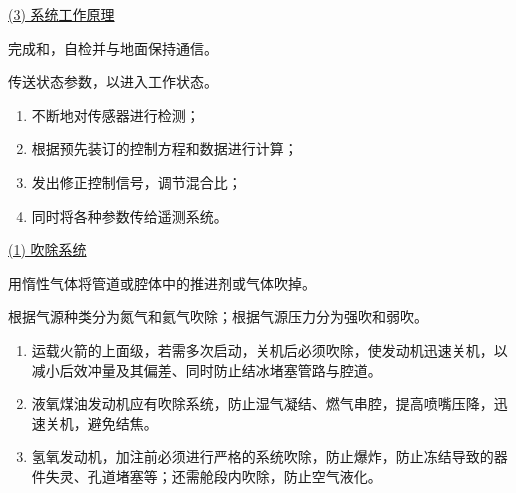 \underline{(3) \hspace*{0.3em} 系统工作原理}
\vspace*{0.5em}

\blue[起飞前] \quad  完成\red[接口初始化]和\red[调节阀门归零位] ，自检并与地面保持通信。

\blue[起飞后] \quad 传送状态参数，以\red[分离信号为零点]进入工作状态。

\blue[飞行过程中] 
\vspace*{-0.5em}
\begin{enumerate}[\hspace*{3em} $\bigstar$]
	\item 不断地对传感器进行检测；\vspace*{-0.5em}
	\item 根据预先装订的控制方程和数据进行计算；\vspace*{-0.5em}
	\item 发出修正控制信号，调节混合比；\vspace*{-0.5em}
	\item 同时将各种参数传给遥测系统。\vspace*{-0.5em}
\end{enumerate}

\vspace*{1em}

\sssection[吹除、置换和气封系统]

\underline{(1) \hspace*{0.3em} 吹除系统}
\vspace*{0.5em}

\blue[概念] \quad 用惰性气体将管道或腔体中的推进剂或气体吹掉。

\blue[分类] \quad 根据气源种类分为氮气和氦气吹除；根据气源压力分为强吹和弱吹。

\blue[作用]
\vspace*{-0.5em}
\begin{enumerate}[\hspace*{3em} $\bigstar$]
	\item 运载火箭的上面级，若需多次启动，关机后必须吹除，使发动机迅速关机，以减小后效冲量及其偏差、同时防止结冰堵塞管路与腔道。\vspace*{-0.5em}
	\item 液氧煤油发动机应有吹除系统，防止湿气凝结、燃气串腔，提高喷嘴压降，迅速关机，避免结焦。\vspace*{-0.5em}
	\item 氢氧发动机，加注前必须进行严格的系统吹除，防止爆炸，防止冻结导致的器件失灵、孔道堵塞等；还需舱段内吹除，防止空气液化。\vspace*{-0.5em}
\end{enumerate}
\vspace*{0.5em}


